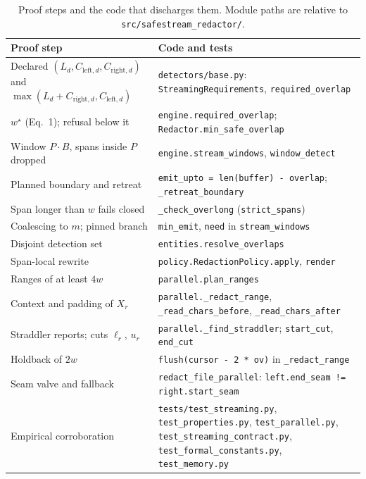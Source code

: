 \documentclass[11pt,a4paper]{article}
\begin{document}
\begin{table}[ht]
\caption{Proof steps and the code that discharges them. Module paths are relative to \texttt{src/\allowbreak safestream\_\allowbreak redactor/}.}\label{t:mapping}
\small
\begin{tabular*}{\textwidth}{@{\extracolsep\fill}>{\raggedright\arraybackslash}p{}>{\raggedright\arraybackslash}p{}}
\toprule
Proof step & Code and tests \\
\midrule
Declared $(L_d, C_{\mathrm{left},d}, C_{\mathrm{right},d})$ and $\max(L_d + C_{\mathrm{right},d}, C_{\mathrm{left},d})$ & \texttt{detectors/base.py}: \texttt{StreamingRequirements}, \texttt{required\_overlap} \\
$w^{\star}$ (Eq.~1); refusal below it & \texttt{engine.required\_overlap}; \texttt{Redactor.min\_safe\_overlap} \\
Window $P \cdot B$, spans inside $P$ dropped & \texttt{engine.stream\_windows}, \texttt{window\_detect} \\
Planned boundary and retreat & \texttt{emit\_upto = len(buffer) - overlap}; \texttt{\_retreat\_boundary} \\
Span longer than $w$ fails closed & \texttt{\_check\_overlong} (\texttt{strict\_spans}) \\
Coalescing to $m$; pinned branch & \texttt{min\_emit}, \texttt{need} in \texttt{stream\_windows} \\
Disjoint detection set & \texttt{entities.resolve\_overlaps} \\
Span-local rewrite & \texttt{policy.RedactionPolicy.apply}, \texttt{render} \\
Ranges of at least $4w$ & \texttt{parallel.plan\_ranges} \\
Context and padding of $X_r$ & \texttt{parallel.\_redact\_range}, \texttt{\_read\_chars\_before}, \texttt{\_read\_chars\_after} \\
Straddler reports; cuts $\ell_r$, $u_r$ & \texttt{parallel.\_find\_straddler}; \texttt{start\_cut}, \texttt{end\_cut} \\
Holdback of $2w$ & \texttt{flush(cursor - 2 * ov)} in \texttt{\_redact\_range} \\
Seam valve and fallback & \texttt{redact\_file\_parallel}: \texttt{left.end\_seam != right.start\_seam} \\
Empirical corroboration & \texttt{tests/test\_streaming.py}, \texttt{test\_properties.py}, \texttt{test\_parallel.py}, \texttt{test\_streaming\_contract.py}, \texttt{test\_formal\_constants.py}, \texttt{test\_memory.py} \\
\bottomrule
\end{tabular*}
\end{table}
\end{document}
